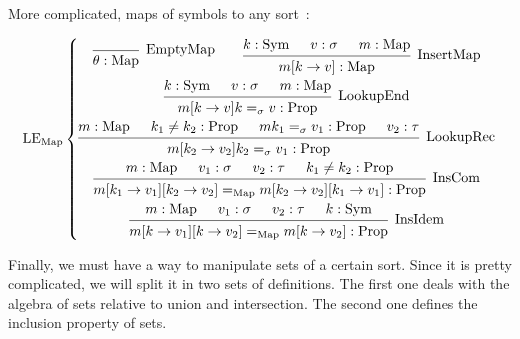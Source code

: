 \documentclass[]{article}
\newcommand{\1}{\mathbbm{1}}
\newcommand{\0}{\mathbbm{0}}
\newcommand{\Prop}{\text{Prop}}
\newcommand{\Sym}{\text{Sym}}
\newcommand{\Map}{\text{Map}}
\newcommand{\proof}[1]{{\scantokens{\begin{prooftree}#1\end{prooftree}}}}
\begin{document}
More complicated, maps of symbols to any sort~:

\[\text{LE}_\text{Map}\left\{
    \begin{gathered}
        \proof{
            \infer0[EmptyMap]{\theta:\Map}
        }
        \qquad\proof{
            \hypo{k : \Sym}
            \hypo{v : \sigma}
            \hypo{m : \Map}
            \infer3[InsertMap]{m[k\rightarrow v] : \Map}
        }\\
        \proof{
            \hypo{k : \Sym}
            \hypo{v : \sigma}
            \hypo{m : \Map}
            \infer3[LookupEnd]{m[k\rightarrow v]k =_\sigma v:\Prop}
        }\\
        \proof{
            \hypo{m : \Map}
            \hypo{k_1\neq k_2 : \Prop}
            \hypo{m k_1 =_\sigma v_1 : \Prop}
            \hypo{v_2 : \tau}
            \infer4[LookupRec]{m[k_2\rightarrow v_2]k_2 =_\sigma v_1 : \Prop}
        }\\
        \proof{
            \hypo{m : \Map}
            \hypo{v_1 : \sigma}
            \hypo{v_2 : \tau}
            \hypo{k_1\neq k_2 : \Prop}
            \infer4[InsCom]{m[k_1\rightarrow v_1][k_2\rightarrow v_2] =_\Map
                    m[k_2\rightarrow v_2][k_1\rightarrow v_1] : \Prop}
        }\\
        \proof{
            \hypo{m : \Map}
            \hypo{v_1 : \sigma}
            \hypo{v_2 : \tau}
            \hypo{k : \Sym}
            \infer4[InsIdem]{m[k\rightarrow v_1][k\rightarrow v_2] =_\Map
                    m[k\rightarrow v_2] : \Prop}
        }
    \end{gathered}
\right.\]

Finally, we must have a way to manipulate sets of a certain sort. Since it is pretty
complicated, we will split it in two sets of definitions. The first one deals with
the algebra of sets relative to union and intersection. The second one defines the
inclusion property of sets.
\end{document}
